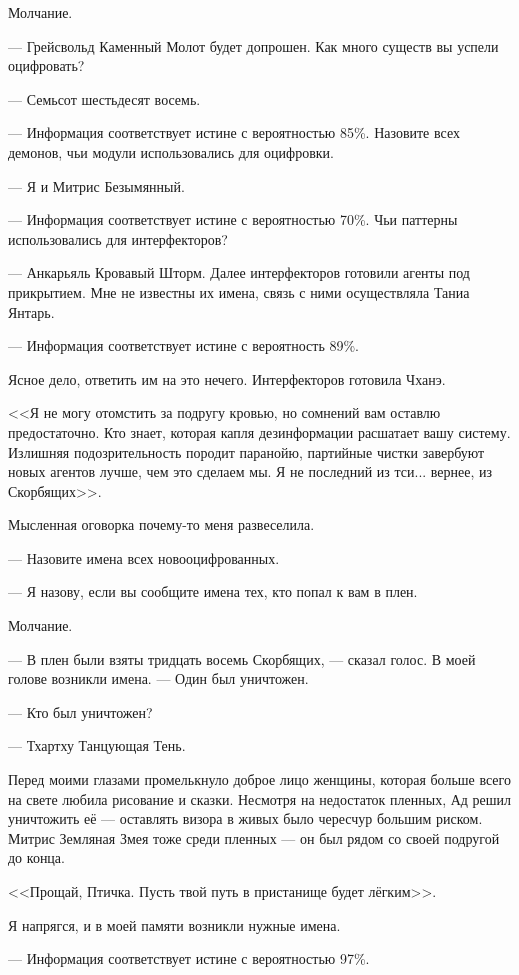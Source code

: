 Молчание.

--- Грейсвольд Каменный Молот будет допрошен.
Как много существ вы успели оцифровать?

--- Семьсот шестьдесят восемь.

--- Информация соответствует истине с вероятностью 85\%.
Назовите всех демонов, чьи модули использовались для оцифровки.

--- Я и Митрис Безымянный.

--- Информация соответствует истине с вероятностью 70\%.
Чьи паттерны использовались для интерфекторов?

--- Анкарьяль Кровавый Шторм.
Далее интерфекторов готовили агенты под прикрытием.
Мне не известны их имена, связь с ними осуществляла Таниа Янтарь.

--- Информация соответствует истине с вероятность 89\%.

Ясное дело, ответить им на это нечего.
Интерфекторов готовила Чханэ.

<<Я не могу отомстить за подругу кровью, но сомнений вам оставлю предостаточно.
Кто знает, которая капля дезинформации расшатает вашу систему.
Излишняя подозрительность породит паранойю, партийные чистки завербуют новых агентов лучше, чем это сделаем мы.
Я не последний из тси... вернее, из Скорбящих>>.

Мысленная оговорка почему-то меня развеселила.

--- Назовите имена всех новооцифрованных.

--- Я назову, если вы сообщите имена тех, кто попал к вам в плен.

Молчание.

--- В плен были взяты тридцать восемь Скорбящих, --- сказал голос.
В моей голове возникли имена.
--- Один был уничтожен.

--- Кто был уничтожен?

--- Тхартху Танцующая Тень.

Перед моими глазами промелькнуло доброе лицо женщины, которая больше всего на свете любила рисование и сказки.
Несмотря на недостаток пленных, Ад решил уничтожить её --- оставлять визора в живых было чересчур большим риском.
Митрис Земляная Змея тоже среди пленных --- он был рядом со своей подругой до конца.

<<Прощай, Птичка.
Пусть твой путь в пристанище будет лёгким>>.

Я напрягся, и в моей памяти возникли нужные имена.

--- Информация соответствует истине с вероятностью 97\%.

